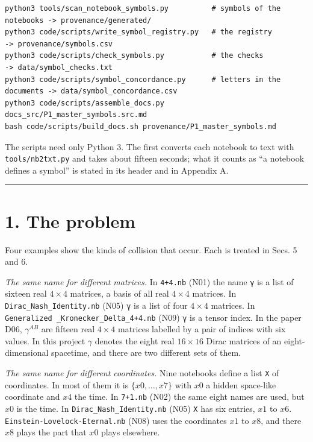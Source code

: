 \documentclass[
  10pt,
]{article}
\begin{document}
\begin{verbatim}
python3 tools/scan_notebook_symbols.py          # symbols of the notebooks -> provenance/generated/
python3 code/scripts/write_symbol_registry.py   # the registry             -> provenance/symbols.csv
python3 code/scripts/check_symbols.py           # the checks               -> data/symbol_checks.txt
python3 code/scripts/symbol_concordance.py      # letters in the documents -> data/symbol_concordance.csv
python3 code/scripts/assemble_docs.py docs_src/P1_master_symbols.src.md
bash code/scripts/build_docs.sh provenance/P1_master_symbols.md
\end{verbatim}

The scripts need only Python 3. The first converts each notebook to text
with \texttt{tools/nb2txt.py} and takes about fifteen seconds; what it
counts as ``a notebook defines a symbol'' is stated in its header and in
Appendix A.

\begin{center}\rule{0.5\linewidth}{0.5pt}\end{center}

\hypertarget{the-problem}{%
\section{1. The problem}\label{the-problem}}

Four examples show the kinds of collision that occur. Each is treated in
Secs. 5 and 6.

\emph{The same name for different matrices.} In \texttt{4+4.nb} (N01)
the name \texttt{γ} is a list of sixteen real \(4\times4\) matrices, a
basis of all real \(4\times4\) matrices. In
\texttt{Dirac\_Nash\_Identity.nb} (N05) \texttt{γ} is a list of four
\(4\times4\) matrices. In
\texttt{Generalized\ \_Kronecker\_Delta\_4+4.nb} (N09) \texttt{γ} is a
tensor index. In the paper D06, \(\gamma^{AB}\) are fifteen real
\(4\times4\) matrices labelled by a pair of indices with six values. In
this project \(\gamma\) denotes the eight real \(16\times16\) Dirac
matrices of an eight-dimensional spacetime, and there are two different
sets of them.

\emph{The same name for different coordinates.} Nine notebooks define a
list \texttt{X} of coordinates. In most of them it is
\(\{x0,\dots,x7\}\) with \(x0\) a hidden space-like coordinate and
\(x4\) the time. In \texttt{7+1.nb} (N02) the same eight names are used,
but \(x0\) is the time. In \texttt{Dirac\_Nash\_Identity.nb} (N05)
\texttt{X} has six entries, \(x1\) to \(x6\).
\texttt{Einstein-Lovelock-Eternal.nb} (N08) uses the coordinates \(x1\)
to \(x8\), and there \(x8\) plays the part that \(x0\) plays elsewhere.
\end{document}
